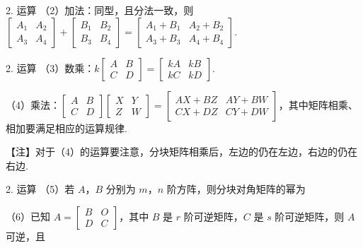 \begin{fcard}{2. 运算}
（2）加法：同型，且分法一致，则 $\begin{bmatrix}A_1 & A_2\\ A_3 & A_4\end{bmatrix}+\begin{bmatrix}B_1 & B_2\\ B_3 & B_4\end{bmatrix}=\begin{bmatrix}A_1+B_1 & A_2+B_2\\ A_3+B_3 & A_4+B_4\end{bmatrix}$.
\end{fcard}

\begin{fcard}{2. 运算}
（3）数乘：$k\begin{bmatrix}A & B\\ C & D\end{bmatrix}=\begin{bmatrix}kA & kB\\ kC & kD\end{bmatrix}$.

（4）乘法：$\begin{bmatrix}A & B\\ C & D\end{bmatrix}\begin{bmatrix}X & Y\\ Z & W\end{bmatrix}=\begin{bmatrix}AX+BZ & AY+BW\\ CX+DZ & CY+DW\end{bmatrix}$，其中矩阵相乘、相加要满足相应的运算规律.
\end{fcard}

\begin{fnote}
【注】对于（4）的运算要注意，分块矩阵相乘后，左边的仍在左边，右边的仍在右边.
\end{fnote}

\begin{fcard}{2. 运算}
（5）若 $A$，$B$ 分别为 $m$，$n$ 阶方阵，则分块对角矩阵的幂为

（6）已知 $A=\begin{bmatrix}B & O\\ D & C\end{bmatrix}$，其中 $B$ 是 $r$ 阶可逆矩阵，$C$ 是 $s$ 阶可逆矩阵，则 $A$ 可逆，且
\end{fcard}

